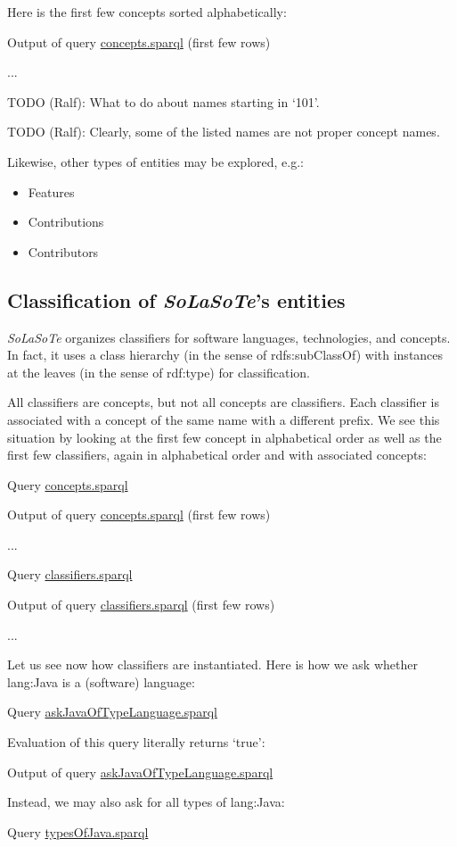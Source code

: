 \documentclass{article}
\newcommand{\uri}[1]{\textsf{#1}}
\newcommand{\todo}[2]{\noindent{}TODO (#1): #2}
\newcommand{\solasote}{{\itshape\textsf{SoLaSoTe}}}
\newcommand{\sparql}[1]{%
\medskip

\noindent
\begin{boxedminipage}{\hsize}
\hfill{}Query \underline{#1.sparql}

\end{boxedminipage}
\medskip
}
\newcommand{\partialOutput}[2]{%

\medskip

\noindent
\begin{boxedminipage}{\hsize}
\hfill{}Output of query \underline{#2.sparql} (first few rows)

{\large{}...}
\end{boxedminipage}
\medskip
}
\newcommand{\completeOutput}[1]{%

\medskip

\noindent
\begin{boxedminipage}{\hsize}
\hfill{}Output of query \underline{#1.sparql}

\end{boxedminipage}
\medskip
}
\begin{document}
\noindent
Here is the first few concepts sorted alphabetically:

\partialOutput{7}{concepts}

\todo{Ralf}{What to do about names starting in `101'.}

\todo{Ralf}{Clearly, some of the listed names are not proper concept names.}

Likewise, other types of entities may be explored, e.g.:

\begin{itemize}
\item Features
\item Contributions
\item Contributors
\end{itemize}


\subsection{Classification of \solasote's entities}

\solasote{} organizes classifiers for software languages,
technologies, and concepts. In fact, it uses a class hierarchy (in the
sense of rdfs:subClassOf) with instances at the leaves (in the sense
of rdf:type) for classification.

All classifiers are concepts, but not all concepts are
classifiers. Each classifier is associated with a concept of the same
name with a different prefix. We see this situation by looking at the
first few concept in alphabetical order as well as the first few
classifiers, again in alphabetical order and with associated concepts: 

\sparql{concepts}

\partialOutput{7}{concepts}

\sparql{classifiers}

\partialOutput{7}{classifiers}

\noindent
Let us see now how classifiers are instantiated. Here is how we ask
whether \uri{lang:Java} is a (software) language:

\sparql{askJavaOfTypeLanguage}

\noindent
Evaluation of this query literally returns `true':

\completeOutput{askJavaOfTypeLanguage}

\noindent
Instead, we may also ask for all types of \uri{lang:Java}:

\sparql{typesOfJava}
\end{document}
